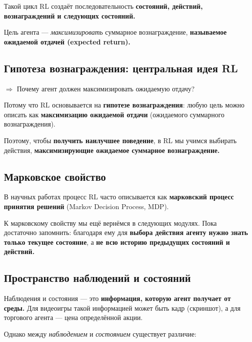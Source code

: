 \documentclass[11pt,a4paper]{article}
\begin{document}
Такой цикл RL создаёт последовательность \textbf{состояний, действий, вознаграждений и следующих состояний.}


Цель агента --- \emph{максимизировать} суммарное вознаграждение, \textbf{называемое ожидаемой отдачей (expected return).}

\subsection{Гипотеза вознаграждения: центральная идея RL}\label{the-reward-hypothesis-the-central-idea-of-reinforcement-learning}

\(\Rightarrow\) Почему агент должен максимизировать ожидаемую отдачу?

Потому что RL основывается на \textbf{гипотезе вознаграждения}: любую цель можно описать как \textbf{максимизацию ожидаемой отдачи} (ожидаемого суммарного вознаграждения).

Поэтому, чтобы \textbf{получить наилучшее поведение}, в RL мы учимся выбирать действия, \textbf{максимизирующие ожидаемое суммарное вознаграждение.}

\subsection{Марковское свойство}\label{markov-property}

В научных работах процесс RL часто описывается как \textbf{марковский процесс принятия решений} (Markov Decision Process, MDP).

К марковскому свойству мы ещё вернёмся в следующих модулях. Пока достаточно запомнить: благодаря ему для \textbf{выбора действия агенту нужно знать только текущее состояние}, а \textbf{не всю историю предыдущих состояний и действий.}

\subsection{Пространство наблюдений и состояний}\label{observationsstates-space}

Наблюдения и состояния --- это \textbf{информация, которую агент получает от среды.} Для видеоигры такой информацией может быть кадр (скриншот), а для торгового агента --- цена определённой акции.

Однако между \emph{наблюдением} и \emph{состоянием} существует различие:
\end{document}
